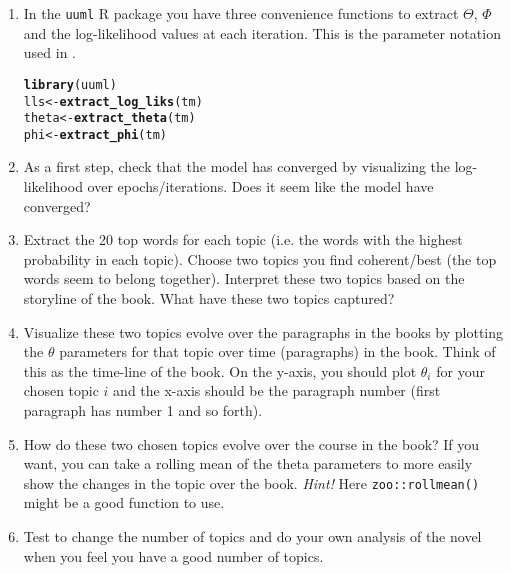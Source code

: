 \documentclass[11pt,a4paper,english]{article}\usepackage[]{graphicx}\usepackage[]{xcolor}
\makeatletter
\newcommand{\hlstd}[1]{\textcolor[rgb]{0.345,0.345,0.345}{#1}}%
\newcommand{\hlkwb}[1]{\textcolor[rgb]{0.69,0.353,0.396}{#1}}%
\newcommand{\hlkwd}[1]{\textcolor[rgb]{0.737,0.353,0.396}{\textbf{#1}}}%
\newenvironment{kframe}{%
 \def\at@end@of@kframe{}%
 \ifinner\ifhmode%
  \def\at@end@of@kframe{\end{minipage}}%
  \begin{minipage}{\columnwidth}%
 \fi\fi%
 \def\FrameCommand##1{\hskip\@totalleftmargin \hskip-\fboxsep
 \colorbox{shadecolor}{##1}\hskip-\fboxsep
     \hskip-\linewidth \hskip-\@totalleftmargin \hskip\columnwidth}%
 \MakeFramed {\advance\hsize-\width
   \@totalleftmargin\z@ \linewidth\hsize
   \@setminipage}}%
 {\par\unskip\endMakeFramed%
 \at@end@of@kframe}
\newenvironment{knitrout}{}{} %
\makeatother
\begin{document}
\begin{enumerate}
\item In the \texttt{uuml} R package you have three convenience functions to extract $\Theta$, $\Phi$ and the log-likelihood values at each iteration. This is the parameter notation used in \citet{griffiths2004finding}.
\begin{knitrout}\small
{}\color{fgcolor}\begin{kframe}
\begin{alltt}
\hlkwd{library}\hlstd{(uuml)}
\hlstd{lls} \hlkwb{<-} \hlkwd{extract_log_liks}\hlstd{(tm)}
\hlstd{theta} \hlkwb{<-} \hlkwd{extract_theta}\hlstd{(tm)}
\hlstd{phi} \hlkwb{<-} \hlkwd{extract_phi}\hlstd{(tm)}
\end{alltt}
\end{kframe}
\end{knitrout}
\item As a first step, check that the model has converged by visualizing the log-likelihood over epochs/iterations. Does it seem like the model have converged?
\item Extract the 20 top words for each topic (i.e. the words with the highest probability in each topic). Choose two topics you find coherent/best (the top words seem to belong together). Interpret these two topics based on the storyline of the book. What have these two topics captured?
\item Visualize these two topics evolve over the paragraphs in the books by plotting the $\theta$ parameters for that topic over time (paragraphs) in the book. Think of this as the time-line of the book. On the y-axis, you should plot $\theta_i$ for your chosen topic $i$ and the x-axis should be the paragraph number (first paragraph has number 1 and so forth).
\item How do these two chosen topics evolve over the course in the book? If you want, you can take a rolling mean of the theta parameters to more easily show the changes in the topic over the book. \emph{Hint!} Here \texttt{zoo::rollmean()} might be a good function to use.
\item Test to change the number of topics and do your own analysis of the novel when you feel you have a good number of topics.

\end{enumerate}


\end{document}
